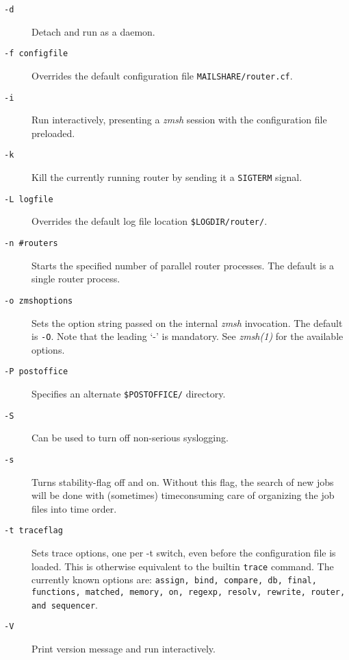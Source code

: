 \begin{description}
\item[{\tt -d}] \mbox{}

Detach and run as a daemon. 

\item[{\tt -f configfile}] \mbox{}

Overrides the default configuration 
file {\tt MAILSHARE/router.cf}. 

\item[{\tt -i}] \mbox{}

Run interactively, presenting a {\em zmsh\/}  
session with the configuration file preloaded. 

\item[{\tt -k}] \mbox{}

Kill the currently running router by 
sending it a {\tt SIGTERM} signal. 

\item[{\tt -L logfile}] \mbox{}

Overrides the default   log file location 
{\tt \$LOGDIR/router/}. 

\item[{\tt -n \#routers}] \mbox{}

Starts the specified number of 
parallel router processes. The default is a single router process. 

\item[{\tt -o zmshoptions}] \mbox{}

Sets the option string passed on the 
internal {\em zmsh\/} invocation. The default is {\tt -O}. 
Note that the leading `-' is mandatory. See {\em zmsh(1)\/} 
for the available options. 

\item[{\tt -P postoffice}] \mbox{}

Specifies an alternate 
{\tt \$POSTOFFICE/} directory. 

\item[{\tt -S}] \mbox{}

Can be used to turn off non-serious syslogging. 

\item[{\tt -s}] \mbox{}

Turns stability-flag off and on. Without this
flag, the search of new jobs will be done with (sometimes) 
timeconsuming care of organizing the job files into time order. 

\item[{\tt -t traceflag}] \mbox{}

Sets trace options, one per -t switch, 
even before the configuration file is loaded. This is otherwise 
equivalent to the builtin {\tt trace} command. The currently 
known options are: {\tt assign, bind, compare, db, final, functions, matched, memory, on, regexp, resolv, rewrite, router, and sequencer}. 

\item[{\tt -V}] \mbox{}

Print version message and run interactively. 

\end{description}
 

